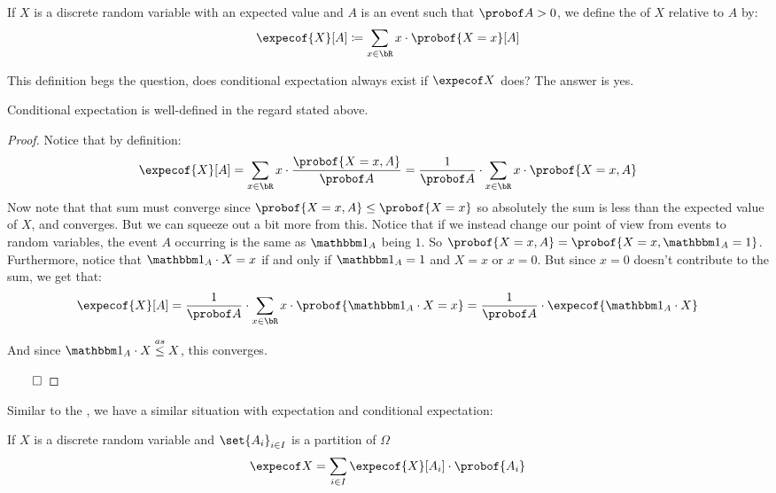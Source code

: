 \begin{defn*}

	If $X$ is a discrete random variable with an expected value and $A$ is an event such that $\probof A>0$,
	we define the  of $X$ relative to $A$ by:
	\[ \expecof{X}[A]\coloneqq\sum_{x\in\bR}x\cdot\probof{X=x}[A] \]

\end{defn*}

This definition begs the question, does conditional expectation always exist if $\expecof X$ does?
The answer is yes.

\begin{prop*}

	Conditional expectation is well-defined in the regard stated above.

\end{prop*}

\begin{proof}

	Notice that by definition:
	\[ \expecof{X}[A] = \sum_{x\in\bR} x\cdot\frac{\probof{X=x,A}}{\probof A} =
	\frac1{\probof A}\cdot\sum_{x\in\bR}x\cdot\probof{X=x,A} \]
	Now note that that sum must converge since $\probof{X=x,A}\leq\probof{X=x}$ so absolutely the
	sum is less than the expected value of $X$, and converges.
	But we can squeeze out a bit more from this.
	Notice that if we instead change our point of view from events to random variables, the event $A$
	occurring is the same as $\bone_A$ being $1$.
	So $\probof{X=x,A}=\probof{X=x,\bone_A=1}$.
	Furthermore, notice that $\bone_A\cdot X=x$ if and only if $\bone_A=1$ and $X=x$ or $x=0$.
	But since $x=0$ doesn't contribute to the sum, we get that:
	\[ \expecof{X}[A] = \frac1{\probof A}\cdot\sum_{x\in\bR}x\cdot\probof{\bone_A\cdot X=x} =
	\frac1{\probof A}\cdot\expecof{\bone_A\cdot X} \]

	And since $\bone_A\cdot X\asleq X$, this converges.

	\hfill$\qed$

\end{proof}

Similar to the , we have a similar situation with expectation and conditional expectation:

\begin{prop*}

	If $X$ is a discrete random variable and $\set{A_i}_{i\in I}$ is a partition of $\Omega$
	\[ \expecof X = \sum_{i\in I}\expecof{X}[A_i]\cdot\probof{A_i} \]

\end{prop*}

